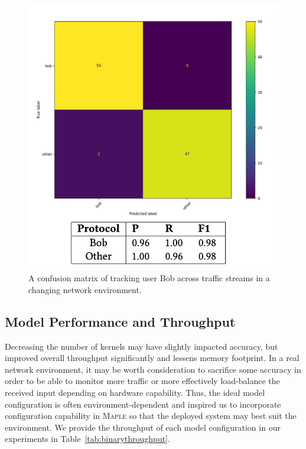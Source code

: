 \begin{figure} [ht!]
\includegraphics[width=\linewidth]{chapters/5/img/userbob.png}
\caption{A confusion matrix of tracking user Bob across traffic streams in a changing network environment.}
\label{fig:userbob}
\end{figure}

\subsection{Model Performance and Throughput}
Decreasing the number of kernels may have slightly impacted accuracy, but improved overall throughput significantly and lessens memory footprint. In a real network environment, it may be worth consideration to sacrifice some accuracy in order to be able to monitor more traffic or more effectively load-balance the received input depending on hardware capability. Thus, the ideal model configuration is often environment-dependent and inspired us to incorporate configuration capability in \textsc{Maple} so that the deployed system may best suit the environment. We provide the throughput of each model configuration in our experiments in Table~\ref{tab:binarythroughput}.
